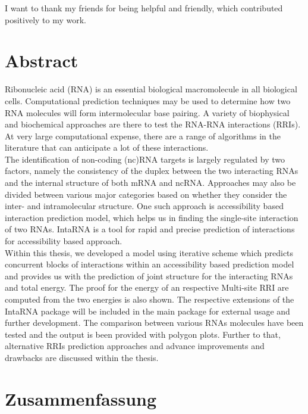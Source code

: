 \documentclass[twoside,a4paper]{report}
\numberwithin{equation}{section}
\begin{document}
I want to thank my friends for being helpful and friendly, which contributed positively to my work.
 \\


\newpage
\chapter*{Abstract}

Ribonucleic acid (RNA) is an essential biological macromolecule in all biological cells. Computational prediction techniques may be used to determine how two RNA molecules will form intermolecular base pairing. A variety of biophysical and biochemical approaches are there to test the RNA-RNA interactions (RRIs). At very large computational expense, there are a range of algorithms in the literature that can anticipate a lot of these interactions.\\

 The identification of non-coding (nc)RNA targets is largely regulated by two factors, namely the consistency of the duplex between the two interacting RNAs and the internal structure of both mRNA and ncRNA. Approaches may also be divided between various major categories based on whether they consider the inter- and intramolecular structure. One such approach is accessibility based interaction prediction model, which helps us in finding the single-site interaction of two RNAs. IntaRNA is a tool for rapid and precise prediction of interactions for accessibility based approach.  \\

 Within this thesis, we developed a model using iterative scheme which predicts concurrent blocks of interactions within an accessibility based prediction model and provides us with the prediction of  joint structure for the interacting RNAs and total energy. The proof for the energy of an respective Multi-site RRI are computed from the two energies is also shown. The respective extensions of the IntaRNA package will be included in the main package for external usage and further development. The comparison between various RNAs molecules have been tested and the output is been provided with polygon plots. Further to that, alternative RRIs prediction approaches and advance improvements and drawbacks are discussed within the thesis. \\



\newpage
\chapter*{Zusammenfassung}
\end{document}
